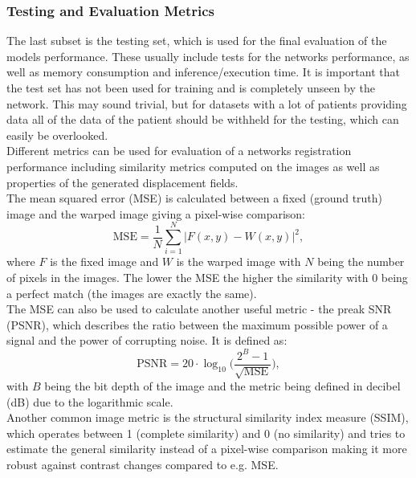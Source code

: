 \documentclass[english,version-2022-01]{uzl-thesis} %
\begin{document}
\subsubsection{Testing and Evaluation Metrics} \label{SubSubSec:TestingEvalutionMetrics}
The last subset is the testing set, which is used for the final evaluation of the models performance. These usually include tests for the networks performance, as well as memory consumption and inference/execution time. It is important that the test set has not been used for training and is completely unseen by the network. This may sound trivial, but for datasets with a lot of patients providing data all of the data of the patient should be withheld for the testing, which can easily be overlooked.\\
Different metrics can be used for evaluation of a networks registration performance including similarity metrics computed on the images as well as properties of the generated displacement fields. \\
The mean squared error (MSE) is calculated between a fixed (ground truth) image and the warped image giving a pixel-wise comparison:
\begin{equation}
	\text{MSE} = \frac{1}{N} \sum_{i=1}^{N} |F(x,y) - W(x,y)|^2,
\end{equation}
where $F$ is the fixed image and $W$ is the warped image with $N$ being the number of pixels in the images. The lower the MSE the higher the similarity with 0 being a perfect match (the images are exactly the same).\\
The MSE can also be used to calculate another useful metric - the preak SNR (PSNR), which describes the ratio between the maximum possible power of a signal and the power of corrupting noise. It is defined as:
\begin{equation}
	\text{PSNR} = 20 \cdot \log_{10} \bigg(\frac{2^B - 1}{\sqrt{\text{MSE}}} \bigg),
\end{equation}
with $B$ being the bit depth of the image and the metric being defined in decibel (dB) due to the logarithmic scale.\\
Another common image metric is the structural similarity index measure (SSIM), which operates between 1 (complete similarity) and 0 (no similarity) and tries to estimate the general similarity instead of a pixel-wise comparison making it more robust against contrast changes compared to e.g. MSE.
\end{document}
